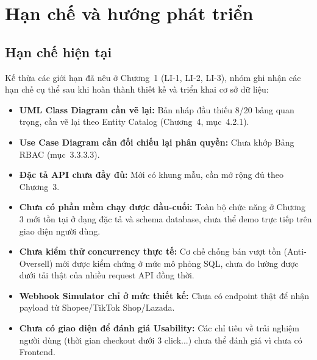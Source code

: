 \section{Hạn chế và hướng phát triển}

\subsection{Hạn chế hiện tại}
Kế thừa các giới hạn đã nêu ở Chương~1 (LI-1, LI-2, LI-3), nhóm ghi nhận các hạn chế cụ thể sau khi hoàn thành thiết kế và triển khai cơ sở dữ liệu:
\begin{itemize}
    \item \textbf{UML Class Diagram cần vẽ lại:} Bản nháp đầu thiếu 8/20 bảng quan trọng, cần vẽ lại theo Entity Catalog (Chương~4, mục~4.2.1).
    \item \textbf{Use Case Diagram cần đối chiếu lại phân quyền:} Chưa khớp Bảng RBAC (mục~3.3.3.3).
    \item \textbf{Đặc tả API chưa đầy đủ:} Mới có khung mẫu, cần mở rộng đủ theo Chương~3.
    \item \textbf{Chưa có phần mềm chạy được đầu-cuối:} Toàn bộ chức năng ở Chương 3 mới tồn tại ở dạng đặc tả và schema database, chưa thể demo trực tiếp trên giao diện người dùng.
    \item \textbf{Chưa kiểm thử concurrency thực tế:} Cơ chế chống bán vượt tồn (Anti-Oversell) mới được kiểm chứng ở mức mô phỏng SQL, chưa đo lường được dưới tải thật của nhiều request API đồng thời.
    \item \textbf{Webhook Simulator chỉ ở mức thiết kế:} Chưa có endpoint thật để nhận payload từ Shopee/TikTok Shop/Lazada.
    \item \textbf{Chưa có giao diện để đánh giá Usability:} Các chỉ tiêu về trải nghiệm người dùng (thời gian checkout dưới 3 click...) chưa thể đánh giá vì chưa có Frontend.
\end{itemize}

